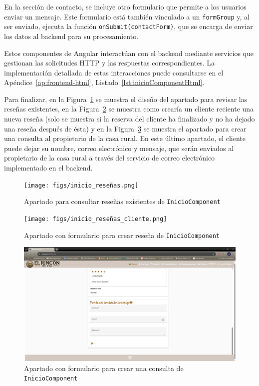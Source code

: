 En la sección de contacto, se incluye otro formulario que permite a los usuarios enviar un mensaje. Este formulario está también vinculado a un \texttt{formGroup} y, al ser enviado, ejecuta la función \texttt{onSubmit(contactForm)}, que se encarga de enviar los datos al backend para su procesamiento.

Estos componentes de Angular interactúan con el backend mediante servicios que gestionan las solicitudes HTTP y las respuestas correspondientes. La implementación detallada de estas interacciones puede consultarse en el Apéndice~\ref{ap:frontend-html}, Listado~\ref{lst:inicioComponentHtml}.

Para finalizar, en la Figura~\ref{fig:inicio-resenas-component} se muestra el diseño del apartado para revisar las reseñas existentes, en la Figura~\ref{fig:inicio-resenas-crear-component} se muestra como crearía un cliente reciente una nueva reseña (solo se muestra si la reserva del cliente ha finalizado y no ha dejado una reseña después de ésta) y en la Figura~\ref{fig:inicio-contacto-crear-component} se muestra el apartado para crear una consulta al propietario de la casa rural. En este último apartado, el cliente puede dejar su nombre, correo electrónico y mensaje, que serán enviados al propietario de la casa rural a través del servicio de correo electrónico implementado en el backend.
\begin{figure}[h!tb]
    \centering
    \texttt{[image: figs/inicio\_reseñas.png]}
    \caption{Apartado para consultar reseñas existentes de \texttt{InicioComponent}}
    \label{fig:inicio-resenas-component}
\end{figure}

\begin{figure}[h!tb]
    \centering
    \texttt{[image: figs/inicio\_reseñas\_cliente.png]}
    \caption{Apartado con formulario para crear reseña de \texttt{InicioComponent}}
    \label{fig:inicio-resenas-crear-component}
\end{figure}

\begin{figure}[h!tb]
    \centering
    \includegraphics[width=1\textwidth]{figs/inicio_contacto.png}
    \caption{Apartado con formulario para crear una consulta de \texttt{InicioComponent}}
    \label{fig:inicio-contacto-crear-component}
\end{figure}

